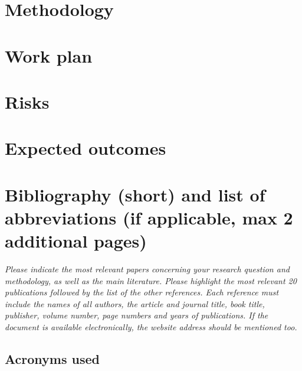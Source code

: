 \documentclass[11pt,twoside,a4paper]{article}
\begin{document}
\section{Methodology}
\label{sec:methodology}


\section{Work plan}
\label{sec:work-plan}


\section{Risks}
\label{sec:risks}


\section{Expected outcomes}
\label{sec:expected-outcomes}



\section{Bibliography (short) and list of abbreviations (if applicable, max 2
  additional pages)}

\emph{Please indicate the most relevant papers concerning your research question
  and methodology, as well as the main literature. Please highlight the most
  relevant 20 publications followed by the list of the other references.    Each
  reference must include the names of all authors, the article and journal
  title, book title, publisher, volume number, page numbers and years of
  publications. If the document is available electronically, the website address
  should be mentioned too.
}

\subsection*{Acronyms used}






\end{document}
